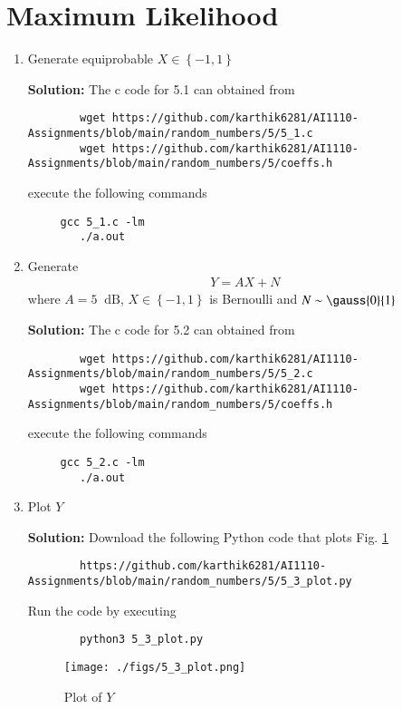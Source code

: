 \documentclass[journal,12pt,twocolumn]{IEEEtran}
\newcommand{\solution}{\noindent \textbf{Solution: }}
\providecommand{\cbrak}[1]{\ensuremath{\left\{#1\right\}}}
\numberwithin{equation}{section}
\renewcommand\thesection{\arabic{section}}
\begin{document}
\section{Maximum Likelihood}
	\begin{enumerate}[label=\thesection.\arabic*,ref=\thesection.\theenumi]
	\item Generate equiprobable 	$X \in \cbrak{-1, 1}$
	
	\solution The c code for 5.1 can obtained from
	\begin{lstlisting}
		wget https://github.com/karthik6281/AI1110-Assignments/blob/main/random_numbers/5/5_1.c
		wget https://github.com/karthik6281/AI1110-Assignments/blob/main/random_numbers/5/coeffs.h
	\end{lstlisting}
	execute the following commands
	\begin{lstlisting}
	 gcc 5_1.c -lm
		./a.out
	\end{lstlisting}
	
	\item Generate 
	\begin{align}
		Y = AX+N
	\end{align}
	where $A = 5$ $~\mathrm{dB}$, $X \in \cbrak{-1, 1}$ is Bernoulli and $N \sim \gauss{0}{1}$
	
	\solution The c code for 5.2 can obtained from
	\begin{lstlisting}
		wget https://github.com/karthik6281/AI1110-Assignments/blob/main/random_numbers/5/5_2.c
		wget https://github.com/karthik6281/AI1110-Assignments/blob/main/random_numbers/5/coeffs.h
	\end{lstlisting}
	execute the following commands
	\begin{lstlisting}
	 gcc 5_2.c -lm
		./a.out
	\end{lstlisting}
	
	\item Plot $Y$
	
	\solution  Download the following Python code that plots Fig. \ref{fig-5.3}
	\begin{lstlisting}
		https://github.com/karthik6281/AI1110-Assignments/blob/main/random_numbers/5/5_3_plot.py
	\end{lstlisting}
	Run the code by executing
	\begin{lstlisting}
		python3 5_3_plot.py
	\end{lstlisting}
	\begin{figure}
		\centering
		\texttt{[image: ./figs/5\_3\_plot.png]}
		\caption{Plot of $Y$}
		\label{fig-5.3}
	\end{figure}
	

\end{enumerate}
\end{document}
